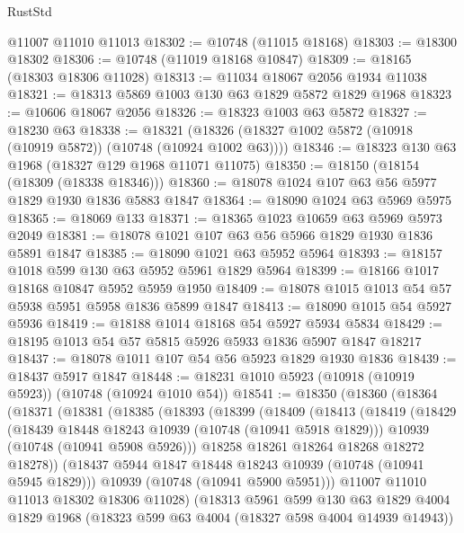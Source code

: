 \begin{lexlean}{RustStd}
\begin{coremodule}
{\begin{coremodule}
{{{{{    @11007
    @11010
    @11013
@18302 := @10748 (@11015 @18168)
@18303 := @18300 @18302
@18306 := @10748 (@11019 @18168 @10847)
@18309 := @18165 (@18303 @18306 @11028)
@18313 := @11034 @18067 @2056 @1934 @11038
@18321 := @18313 @5869 @1003 @130 @63 @1829 @5872 @1829 @1968
@18323 := @10606 @18067 @2056
@18326 := @18323 @1003 @63 @5872
@18327 := @18230 @63
@18338 := @18321 (@18326 (@18327 @1002 @5872 (@10918 (@10919 @5872)) (@10748 (@10924 @1002 @63))))
@18346 := @18323 @130 @63 @1968 (@18327 @129 @1968 @11071 @11075)
@18350 := @18150 (@18154 (@18309 (@18338 @18346)))
@18360 := @18078 @1024 @107 @63 @56 @5977 @1829 @1930 @1836 @5883 @1847
@18364 := @18090 @1024 @63 @5969 @5975
@18365 := @18069 @133
@18371 := @18365 @1023 @10659 @63 @5969 @5973 @2049
@18381 := @18078 @1021 @107 @63 @56 @5966 @1829 @1930 @1836 @5891 @1847
@18385 := @18090 @1021 @63 @5952 @5964
@18393 := @18157 @1018 @599 @130 @63 @5952 @5961 @1829 @5964
@18399 := @18166 @1017 @18168 @10847 @5952 @5959 @1950
@18409 := @18078 @1015 @1013 @54 @57 @5938 @5951 @5958 @1836 @5899 @1847
@18413 := @18090 @1015 @54 @5927 @5936
@18419 := @18188 @1014 @18168 @54 @5927 @5934 @5834
@18429 := @18195 @1013 @54 @57 @5815 @5926 @5933 @1836 @5907 @1847 @18217
@18437 := @18078 @1011 @107 @54 @56 @5923 @1829 @1930 @1836
@18439 := @18437 @5917 @1847
@18448 := @18231 @1010 @5923 (@10918 (@10919 @5923)) (@10748 (@10924 @1010 @54))
@18541 := @18350
    (@18360
      (@18364
        (@18371
          (@18381
            (@18385
              (@18393
                (@18399
                  (@18409
                    (@18413
                      (@18419
                        (@18429
                          (@18439 @18448 @18243 @10939 (@10748 (@10941 @5918 @1829)))
                          @10939
                          (@10748 (@10941 @5908 @5926)))
                        @18258
                        @18261
                        @18264
                        @18268
                        @18272
                        @18278))
                    (@18437 @5944 @1847 @18448 @18243 @10939 (@10748 (@10941 @5945 @1829)))
                    @10939
                    (@10748 (@10941 @5900 @5951)))
                  @11007
                  @11010
                  @11013
                  @18302
                  @18306
                  @11028)
                (@18313
                  @5961
                  @599
                  @130
                  @63
                  @1829
                  @4004
                  @1829
                  @1968
                  (@18323 @599 @63 @4004 (@18327 @598 @4004 @14939 @14943))
}}}}}
\end{coremodule}}
\end{coremodule}
\end{lexlean}
